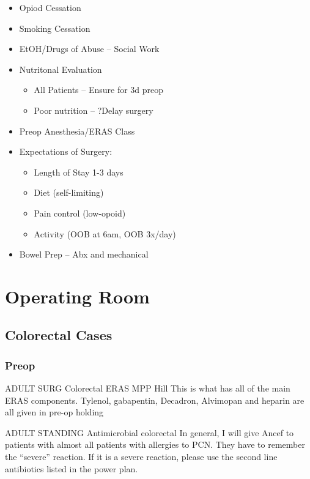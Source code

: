 \documentclass[
  letterpaper,
]{scrbook}
\providecommand{\tightlist}{%
  \setlength{\itemsep}{0pt}\setlength{\parskip}{0pt}}
\begin{document}
\begin{itemize}
\tightlist
\item
  Opiod Cessation
\item
  Smoking Cessation
\item
  EtOH/Drugs of Abuse -- Social Work
\item
  Nutritonal Evaluation

  \begin{itemize}
  \tightlist
  \item
    All Patients -- Ensure for 3d preop
  \item
    Poor nutrition -- ?Delay surgery
  \end{itemize}
\item
  Preop Anesthesia/ERAS Class
\item
  Expectations of Surgery:

  \begin{itemize}
  \tightlist
  \item
    Length of Stay 1-3 days
  \item
    Diet (self-limiting)
  \item
    Pain control (low-opoid)
  \item
    Activity (OOB at 6am, OOB 3x/day)
  \end{itemize}
\item
  Bowel Prep -- Abx and mechanical
\end{itemize}

\part{Operating Room}

\chapter{Colorectal Cases}\label{colorectal-cases}

\section{Preop}\label{preop}

ADULT SURG Colorectal ERAS MPP Hill This is what has all of the main
ERAS components. Tylenol, gabapentin, Decadron, Alvimopan and heparin
are all given in pre-op holding

ADULT STANDING Antimicrobial colorectal In general, I will give Ancef to
patients with almost all patients with allergies to PCN. They have to
remember the ``severe'' reaction. If it is a severe reaction, please use
the second line antibiotics listed in the power plan.
\end{document}
